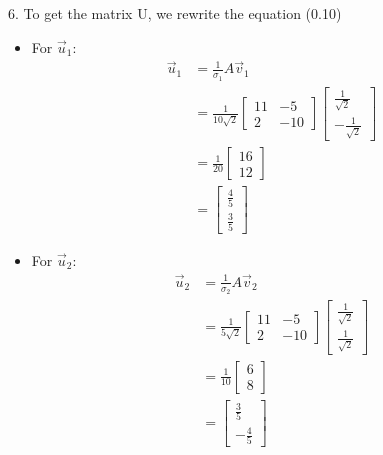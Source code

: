 \documentclass[12pt]{article}
\begin{document}
6. To get the matrix U, we rewrite the equation (0.10)
\begin{itemize}
    \item For $\vec{u}_1$:
          \begin{align*}
              \vec{u}_1 & = \frac{1}{\sigma_{1}} A \vec{v}_1                                                                                                                                            \\
                        & = \frac{1}{10\sqrt{2}} \begin{bmatrix} 11 & -5 \\ 2 & -10 \end{bmatrix} \begin{bmatrix} \frac{1}{\sqrt{2}} \\ -\frac{1}{\sqrt{2}} \end{bmatrix} \\
                        & = \frac{1}{20} \begin{bmatrix} 16 \\ 12 \end{bmatrix}                                                                                                                         \\
                        & = \begin{bmatrix} \frac{4}{5} \\ \frac{3}{5} \end{bmatrix}
          \end{align*}
    \item For $\vec{u}_2$:
          \begin{align*}
              \vec{u}_2 & = \frac{1}{\sigma_{2}} A \vec{v}_2                                                                                                                                          \\
                        & = \frac{1}{5\sqrt{2}} \begin{bmatrix} 11 & -5 \\ 2 & -10 \end{bmatrix} \begin{bmatrix} \frac{1}{\sqrt{2}} \\ \frac{1}{\sqrt{2}} \end{bmatrix} \\
                        & = \frac{1}{10} \begin{bmatrix} 6 \\ 8 \end{bmatrix}                                                                                                                         \\
                        & = \begin{bmatrix} \frac{3}{5} \\ -\frac{4}{5} \end{bmatrix}
          \end{align*}
\end{itemize}
\end{document}
